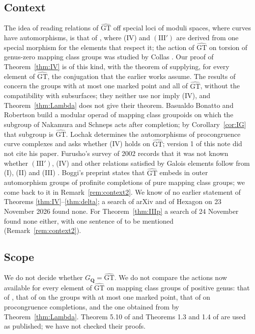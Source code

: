 \documentclass[11pt,a4paper]{article}
\theoremstyle{plain}
\theoremstyle{definition}
\theoremstyle{remark}
\newcommand{\GT}{\widehat{\mathrm{GT}}}
\newcommand{\GQ}{G_{\mathbf Q}}
\begin{document}
\subsection*{Context}
The idea of reading relations of $\GT$ off special loci of moduli spaces, where curves have automorphisms, is that
of \cite{S}, where (IV) and $(\mathrm{III}')$ are derived from one special morphism for the elements that respect
it; the action of $\GT$ on torsion of genus-zero mapping class groups was studied by Collas \cite{Co}. Our proof
of Theorem~\ref{thm:IV} is of this kind, with the theorem of \cite{BZ} supplying, for every element of $\GT$, the
conjugation that the earlier works assume. The results of \cite{LNS} concern the groups with at most one marked
point and all of $\GT$, without the compatibility with subsurfaces; they neither use nor imply (IV), and
Theorem~\ref{thm:Lambda} does not give their theorem. Basualdo Bonatto and Robertson \cite{BBR} build a modular
operad of mapping class groupoids on which the subgroup of Nakamura and Schneps acts after completion; by
Corollary~\ref{cor:IG} that subgroup is $\GT$. Lochak \cite{Lo} determines the automorphisms of procongruence
curve complexes and asks whether (IV) holds on $\GT$; version 1 of this note did not cite his paper. Furusho's
survey of 2002 records that it was not known whether $(\mathrm{III}')$, (IV) and other relations satisfied by Galois
elements follow from (I), (II) and (III) \cite[p.~191]{Fu}. Boggi's preprint \cite{Bo} states that $\GT$ embeds in outer automorphism groups
of profinite completions of pure mapping class groups; we come back to it in Remark~\ref{rem:context2}. We know of no
earlier statement of Theorems \ref{thm:IV}--\ref{thm:delta}; a search of arXiv and of Hexagon on 23 November 2026
found none. For Theorem~\ref{thm:IIIp} a search of 24 November found none either, with one sentence of \cite{Lo} to
be mentioned (Remark~\ref{rem:context2}).

\subsection*{Scope}
We do not decide whether $\GQ=\GT$. We do not compare the actions now available for every element of $\GT$ on
mapping class groups of positive genus: that of \cite{NS}, that of \cite{LNS} on the groups with at most one marked
point, that of \cite{Lo} on procongruence completions, and the one obtained from \cite{HLS} by
Theorem~\ref{thm:Lambda}. Theorem 5.10 of \cite{Lo} and Theorems 1.3 and 1.4 of \cite{NS} are used as published; we
have not checked their proofs.
\end{document}
